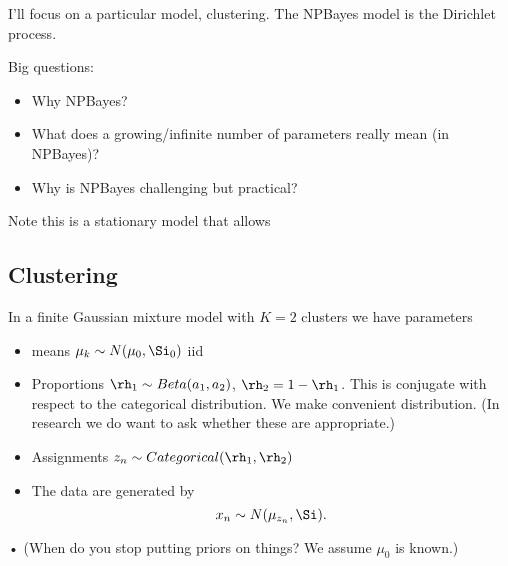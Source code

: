 I'll focus on a particular model, clustering. The  NPBayes model is the Dirichlet process.

Big questions:
\begin{itemize}
\item
Why NPBayes?
\item
What does a growing/infinite number of parameters really mean (in NPBayes)?
\item
Why is NPBayes challenging but practical?
\end{itemize}
Note this is a stationary model that allows 

\subsection{Clustering}

In a finite Gaussian mixture model with $K=2$ clusters we have parameters
\begin{itemize}
\item
means $\mu_k\sim N(\mu_0,\Si_0)$ iid
\item
Proportions
$\rh_1\sim Beta(a_1,a_2)$, $\rh_2=1-\rh_1$.
This is conjugate with respect to the categorical distribution. We make convenient distribution. (In research we do want to ask whether these are appropriate.)
\item
Assignments
$z_n\sim Categorical(\rh_1,\rh_2)$
\item
The data are generated by 
$$
x_n\sim N(\mu_{z_n},\Si).
$$
\end{itemize}•
(When do you stop putting priors on things? We assume $\mu_0$ is known.)

